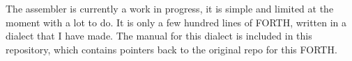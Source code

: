 The assembler is currently a work in progress, it is simple and limited at the moment with a lot to do. It is only a few hundred lines of F\-O\-R\-T\-H, written in a dialect that I have made. The manual for this dialect is included in this repository, which contains pointers back to the original repo for this F\-O\-R\-T\-H. 